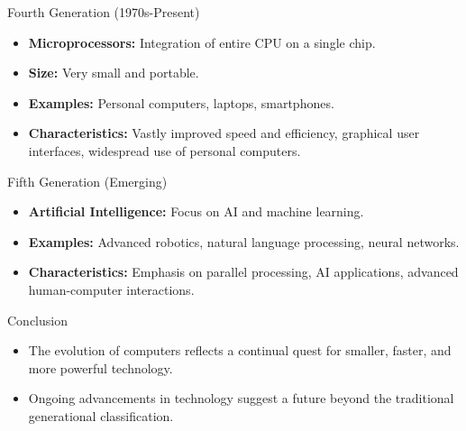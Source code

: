 \begin{frame}{Fourth Generation (1970s-Present)}
  \begin{itemize}
    \item \textbf{Microprocessors:} Integration of entire CPU on a single chip.
    \item \textbf{Size:} Very small and portable.
    \item \textbf{Examples:} Personal computers, laptops, smartphones.
    \item \textbf{Characteristics:} Vastly improved speed and efficiency, graphical user interfaces, widespread use of personal computers.
  \end{itemize}
\end{frame}

\begin{frame}{Fifth Generation (Emerging)}
  \begin{itemize}
    \item \textbf{Artificial Intelligence:} Focus on AI and machine learning.
    \item \textbf{Examples:} Advanced robotics, natural language processing, neural networks.
    \item \textbf{Characteristics:} Emphasis on parallel processing, AI applications, advanced human-computer interactions.
  \end{itemize}
\end{frame}

\begin{frame}{Conclusion}
  \begin{itemize}
    \item The evolution of computers reflects a continual quest for smaller, faster, and more powerful technology.
    \item Ongoing advancements in technology suggest a future beyond the traditional generational classification.
  \end{itemize}
\end{frame}
